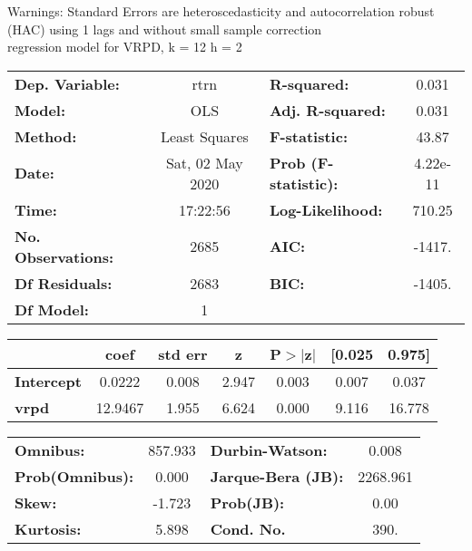 Warnings: \newline
 [1] Standard Errors are heteroscedasticity and autocorrelation robust (HAC) using 1 lags and without small sample correction\\ 

regression model for VRPD, k = 12 h = 2\begin{center}
\begin{tabular}{lclc}
\toprule
\textbf{Dep. Variable:}    &       rtrn       & \textbf{  R-squared:         } &     0.031   \\
\textbf{Model:}            &       OLS        & \textbf{  Adj. R-squared:    } &     0.031   \\
\textbf{Method:}           &  Least Squares   & \textbf{  F-statistic:       } &     43.87   \\
\textbf{Date:}             & Sat, 02 May 2020 & \textbf{  Prob (F-statistic):} &  4.22e-11   \\
\textbf{Time:}             &     17:22:56     & \textbf{  Log-Likelihood:    } &    710.25   \\
\textbf{No. Observations:} &        2685      & \textbf{  AIC:               } &    -1417.   \\
\textbf{Df Residuals:}     &        2683      & \textbf{  BIC:               } &    -1405.   \\
\textbf{Df Model:}         &           1      & \textbf{                     } &             \\
\bottomrule
\end{tabular}
\begin{tabular}{lcccccc}
                   & \textbf{coef} & \textbf{std err} & \textbf{z} & \textbf{P$> |$z$|$} & \textbf{[0.025} & \textbf{0.975]}  \\
\midrule
\textbf{Intercept} &       0.0222  &        0.008     &     2.947  &         0.003        &        0.007    &        0.037     \\
\textbf{vrpd}      &      12.9467  &        1.955     &     6.624  &         0.000        &        9.116    &       16.778     \\
\bottomrule
\end{tabular}
\begin{tabular}{lclc}
\textbf{Omnibus:}       & 857.933 & \textbf{  Durbin-Watson:     } &    0.008  \\
\textbf{Prob(Omnibus):} &   0.000 & \textbf{  Jarque-Bera (JB):  } & 2268.961  \\
\textbf{Skew:}          &  -1.723 & \textbf{  Prob(JB):          } &     0.00  \\
\textbf{Kurtosis:}      &   5.898 & \textbf{  Cond. No.          } &     390.  \\
\bottomrule
\end{tabular}
\end{center}


